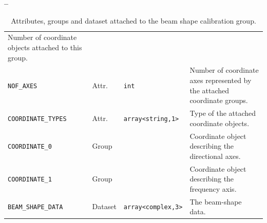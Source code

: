 \documentclass[a4paper,10pt,bibtotoc]{scrartcl}
\begin{document}
\begin{list}{\textbf{--}}{}
\begin{table}[ht]
\begin{tabular}{|lllp{6cm}|}
      Number of coordinate objects attached to this group. \\
      \verb|NOF_AXES|         & Attr. & \verb|int|             &
      Number of coordinate axes represented by the attached coordinate
      groups. \\
      \verb|COORDINATE_TYPES| & Attr. & \verb|array<string,1>| & Type
      of the attached coordinate objects. \\
      \hline 
      \verb|COORDINATE_0|      & Group   &             & Coordinate
      object describing the directional axes. \\
      \verb|COORDINATE_1|      & Group   &             & Coordinate
      object describing the frequency axis. \\
     \verb|BEAM_SHAPE_DATA|  & Dataset & \verb|array<complex,3>| & The beam-shape data. \\
      \hline
    \end{tabular}
    \caption{Attributes, groups and dataset attached to the beam shape
      calibration group.}
    \label{tab:beam shape group}
  \end{table}

\end{list}
\end{document}
